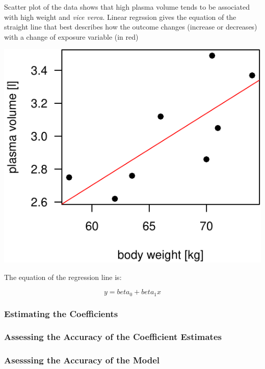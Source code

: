 \documentclass[]{article}
\begin{document}
Scatter plot of the data shows that high plasma volume tends to be
associated with high weight and \emph{vice verca}. Linear regrssion
gives the equation of the straight line that best describes how the
outcome changes (increase or decreases) with a change of exposure
variable (in red)

\begin{center}\includegraphics{session-regression-I-files/figures/fig-reg-1} \end{center}

The equation of the regression line is:

\[y=beta_0 + beta_1x\]

\hypertarget{estimating-the-coefficients}{%
\subsubsection{Estimating the
Coefficients}\label{estimating-the-coefficients}}

\hypertarget{assessing-the-accuracy-of-the-coefficient-estimates}{%
\subsubsection{Assessing the Accuracy of the Coefficient
Estimates}\label{assessing-the-accuracy-of-the-coefficient-estimates}}

\hypertarget{asesssing-the-accuracy-of-the-model}{%
\subsubsection{Asesssing the Accuracy of the
Model}\label{asesssing-the-accuracy-of-the-model}}
\end{document}
